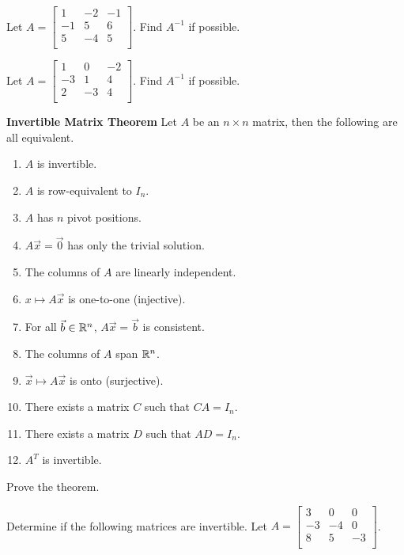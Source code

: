 \begin{enumerate}

\Problem 
\Part Let $A=\begin{bmatrix}
1 & -2 & -1\\
-1 &5 & 6\\
5 &-4 & 5\\
\end{bmatrix}$. Find $A^{-1}$ if possible.

\vfill

\Part Let $A=\begin{bmatrix}
1 & 0 & -2\\
-3 &1 & 4\\
2 &-3 & 4\\
\end{bmatrix}$. Find $A^{-1}$ if possible.

\vfill

\newpage

{\bf Invertible Matrix Theorem} Let $A$ be an $n \times n$ matrix, then the following are all equivalent.
\begin{enumerate}
\item $A$ is invertible.
\item $A$ is row-equivalent to $I_n$.
\item $A$ has $n$ pivot positions.
\item $A\vec{x}=\vec{0}$ has only the trivial solution.
\item The columns of $A$ are linearly independent.
\item $x\mapsto A\vec{x}$ is one-to-one (injective).
\item For all $\vec{b}\in \mathbb{R}^n$, $A\vec{x}=\vec{b}$ is consistent.
\item The columns of $A$ span $\mathbb{R}^n$.
\item $\vec{x} \mapsto A\vec{x}$ is onto (surjective).
\item There exists a matrix $C$ such that $CA=I_n$.
\item There exists a matrix $D$ such that $AD=I_n$.
\item $A^{T}$ is invertible.
\end{enumerate}

\Problem Prove the theorem.

\newpage

\Problem Determine if the following matrices are invertible.
\Part Let $A=\begin{bmatrix}
3 & 0 & 0\\
-3 &-4 & 0\\
8 & 5 & -3\\
\end{bmatrix}$.


\end{enumerate}
